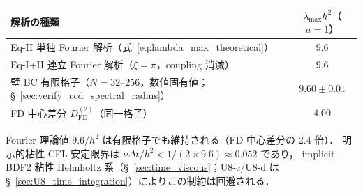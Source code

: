 \begin{tcolorbox}[mybox, title={CCD $D^{(2)}$ スペクトル半径のまとめ}]
\begin{center}
\PaperTableSetup
\begin{tabular}{lc}
\hline
解析の種類 & $\lambda_{\max} h^2$（$a=1$）\\
\hline
Eq-II 単独 Fourier 解析（式~\eqref{eq:lambda_max_theoretical}） & $9.6$ \\
Eq-I+II 連立 Fourier 解析（$\xi=\pi$，coupling 消滅） & $9.6$ \\
壁 BC 有限格子（$N = 32$--$256$，数値固有値；§~\ref{sec:verify_ccd_spectral_radius}） & $9.60 \pm 0.01$ \\
FD 中心差分 $D^{(2)}_{\mathrm{FD}}$（同一格子） & $4.00$ \\
\hline
\end{tabular}
\end{center}
Fourier 理論値 $9.6/h^2$ は有限格子でも維持される（FD 中心差分の 2.4 倍）．
明示的粘性 CFL 安定限界は $\nu\Delta t/h^2 < 1/(2 \times 9.6) \approx 0.052$ であり，
implicit--BDF2 粘性 Helmholtz 系（§~\ref{sec:time_viscous}；U8-c/U8-d は
§~\ref{sec:U8_time_integration}）によりこの制約は回避される．
\end{tcolorbox}

